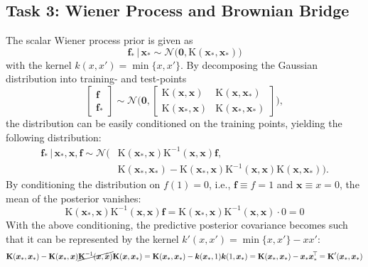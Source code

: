 \documentclass[11pt, a4paper]{scrartcl}
\newcommand{\normal}{\mathcal{N}}
\newcommand{\transposed}{{\!\top\!}}
\renewcommand{\vec}[1]{\bm{#1}}
\newcommand{\mat}[1]{\bm{\mathrm{#1}}}
\newcommand{\given}{\,\vert\,}
\newcommand{\task}[2]{\subsection*{Task #1: #2}}
\begin{document}
		\task{3}{Wiener Process and Brownian Bridge}
			The scalar Wiener process prior is given as
			\begin{equation}
				\vec{f}_\ast \given \vec{x}_\ast \sim \normal\big( \vec{0}, \mat{K}(\vec{x}_\ast, \vec{x}_\ast) \big)
			\end{equation}
			with the kernel \( k(x, x') = \min\{ x, x' \} \). By decomposing the Gaussian distribution into training- and test-points
			\begin{equation}
				\begin{bmatrix}
					\vec{f} \\
					\vec{f}_\ast
				\end{bmatrix}
				\sim
				\normal\Bigg(\! \vec{0},
					\begin{bmatrix}
						\mat{K}(\vec{x}, \vec{x})      & \mat{K}(\vec{x}, \vec{x}_\ast) \\
						\mat{K}(\vec{x}_\ast, \vec{x}) & \mat{K}(\vec{x}_\ast, \vec{x}_\ast)
					\end{bmatrix} \!\!\Bigg),
			\end{equation}
			the distribution can be easily conditioned on the training points, yielding the following distribution:
			\begin{align}
				\vec{f}_\ast \given \vec{x}_\ast, \vec{x}, \vec{f}
					\sim \normal\big(
						&\mat{K}(\vec{x}_\ast, \vec{x}) \mat{K}^{-1}(\vec{x}, \vec{x}) \vec{f},\, \\
						&\mat{K}(\vec{x}_\ast, \vec{x}_\ast) - \mat{K}(\vec{x}_\ast, \vec{x}) \mat{K}^{-1}(\vec{x}, \vec{x}) \mat{K}(\vec{x}, \vec{x}_\ast)
					\big).
			\end{align}
			By conditioning the distribution on \( f(1) = 0 \), i.e., \( \vec{f} \equiv f = 1 \) and \( \vec{x} \equiv x = 0 \), the mean of the posterior vanishes:
			\begin{equation}
				\mat{K}(\vec{x}_\ast, \vec{x}) \mat{K}^{-1}(\vec{x}, \vec{x}) \vec{f}
					= \mat{K}(\vec{x}_\ast, \vec{x}) \mat{K}^{-1}(\vec{x}, \vec{x}) \cdot 0
					= 0
			\end{equation}
			With the above conditioning, the predictive posterior covariance becomes such that it can be represented by the kernel \( k'(x, x') = \min\{ x, x' \} - x x' \):
			\begin{equation}
				\mat{K}(\vec{x}_\ast, \vec{x}_\ast) - \mat{K}(\vec{x}_\ast, \vec{x}) \cancel{\mat{K}^{-1}(\vec{x}, \vec{x})} \mat{K}(\vec{x}, \vec{x}_\ast)
					= \mat{K}(\vec{x}_\ast, \vec{x}_\ast) - \vec{k}(\vec{x}_\ast, 1) \vec{k}(1, \vec{x}_\ast)
					= \mat{K}(\vec{x}_\ast, \vec{x}_\ast) - \vec{x}_\ast \vec{x}_\ast^\transposed
					= \mat{K}'(\vec{x}_\ast, \vec{x}_\ast)
			\end{equation}
\end{document}
